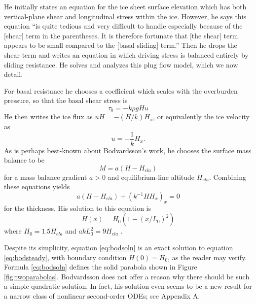 \documentclass[review,letterpaper]{igs}
\begin{document}
He initially states an equation for the ice sheet surface elevation which has both vertical-plane shear and longitudinal stress within the ice.  However, he says this equation ``is quite tedious and very difficult to handle especially because of the [shear] term in the parentheses.  It is therefore fortunate that [the shear] term appears to be small compared to the [basal sliding] term.''  Then he drops the shear term and writes an equation in which driving stress is balanced entirely by sliding resistance.  He solves and analyzes this plug flow model, which we now detail.

For basal resistance he chooses a coefficient which scales with the overburden pressure, so that the basal shear stress is
\begin{equation}
\tau_b = - k \rho g H u  \label{eq:bodstresschoice}
\end{equation}
He then writes the ice flux as $uH=-(H/k) H_x$, or equivalently the ice velocity as
\begin{equation}
u = - \frac{1}{k} H_x. \label{eq:bodvelocity}
\end{equation}
As is perhaps best-known about Bodvardsson's work, he chooses the surface mass balance to be
\begin{equation}
M = a (H - H_{ela})  \label{eq:bodmassbalance}
\end{equation}
for a mass balance gradient $a>0$ and equilibrium-line altitude $H_{ela}$.  Combining these equations yields \citep[equation (17)]{Bodvardsson}
\begin{equation}
a (H - H_{ela}) + (k^{-1} H H_x)_x = 0  \label{eq:bodsteady}
\end{equation}
for the thickness.  His solution to this equation is \citep[equivalent equations (18) and (23)]{Bodvardsson}
\begin{equation}
H(x) = H_0 (1 - (x/L_0)^2)  \label{eq:bodsoln}
\end{equation}
where $H_0 = 1.5 H_{ela}$ and $a k L_0^2 = 9 H_{ela}$ \citep[equation (24)]{Bodvardsson}.

Despite its simplicity, equation \eqref{eq:bodsoln} is an exact solution to equation \eqref{eq:bodsteady}, with boundary condition $H(0)=H_0$, as the reader may verify.  Formula \eqref{eq:bodsoln} defines the solid parabola shown in Figure \ref{fig:twoparabolas}.  Bodvardsson does not offer a reason why there should be such a simple quadratic solution.  In fact, his solution even seems to be a new result for a narrow class of nonlinear second-order ODEs; see Appendix A.
\end{document}
